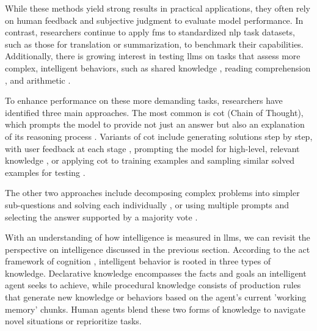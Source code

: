 

While these methods yield strong results in practical applications, they often rely on human feedback and subjective judgment to evaluate model performance. In contrast, researchers continue to apply \glspl{fm} to standardized \gls{nlp} task datasets, such as those for translation or summarization, to benchmark their capabilities. Additionally, there is growing interest in testing \glspl{llm} on tasks that assess more complex, intelligent behaviors, such as shared knowledge \cite{talmor2019commonsenseqaquestionansweringchallenge}, reading comprehension \cite{zhang2018recordbridginggaphuman}, and arithmetic \cite{cobbe2021trainingverifierssolvemath}.

\pskip

To enhance performance on these more demanding tasks, researchers have identified three main approaches. The most common is \gls{cot} (Chain of Thought), which prompts the model to provide not just an answer but also an explanation of its reasoning process \cite{wei2023chainofthoughtpromptingelicitsreasoning}. Variants of \gls{cot} include generating solutions step by step, with user feedback at each stage \cite{zhou2023threadthoughtunravelingchaotic}, prompting the model for high-level, relevant knowledge \cite{zheng2024stepbackevokingreasoning}, or applying \gls{cot} to training examples and sampling similar solved examples for testing \cite{li2024dialoguepromptingpolicygradientbaseddiscrete}. 

\pskip

The other two approaches include decomposing complex problems into simpler sub-questions and solving each individually \cite{patel2022questiondecompositionunitneed} \cite{wang2023planandsolvepromptingimprovingzeroshot}, or using multiple prompts and selecting the answer supported by a majority vote \cite{khalifa2023exploringdemonstrationensemblingincontext} \cite{wang2023selfconsistencyimproveschainthought}.

\pskip

 With an understanding of how intelligence is measured in \glspl{llm}, we can revisit the perspective on intelligence discussed in the previous section. According to the \Gls{act} framework of cognition \cite{Anderson2013}, intelligent behavior is rooted in three types of knowledge. Declarative knowledge encompasses the facts and goals an intelligent agent seeks to achieve, while procedural knowledge consists of production rules that generate new knowledge or behaviors based on the agent’s current 'working memory' chunks. Human agents blend these two forms of knowledge to navigate novel situations or reprioritize tasks.

